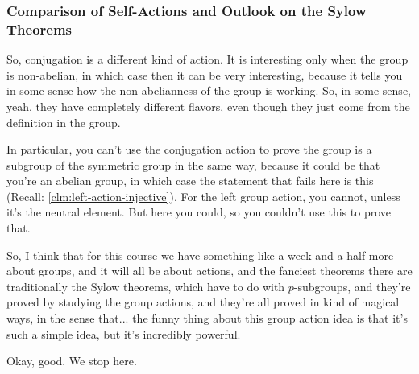 \begin{hidden}
\end{hidden}

\subsubsection{Comparison of Self-Actions and Outlook on the Sylow Theorems}

\begin{speech}[01:22:55 - 01:24:20]
So, conjugation is a different kind of action. It is interesting only when the group is non-abelian, in which case then it can be very interesting, because it tells you in some sense how the non-abelianness of the group is working. So, in some sense, yeah, they have completely different flavors, even though they just come from the definition in the group.

In particular, you can't use the conjugation action to prove the group is a subgroup of the symmetric group in the same way, because it could be that you're an abelian group, in which case the statement that fails here  is this  (Recall: \cref{clm:left-action-injective}). For the left group action, you cannot, unless it's the neutral element. But here you could, so you couldn't use this to prove that.

So, I think that for this course we have something like a week and a half more about groups, and it will all be about actions, and the fanciest theorems there are traditionally the Sylow theorems, which have to do with $p$-subgroups, and they're proved by studying the group actions, and they're all proved in kind of magical ways, in the sense that... the funny thing about this group action idea is that it's such a simple idea, but it's incredibly powerful.

Okay, good. We stop here.
\end{speech}

